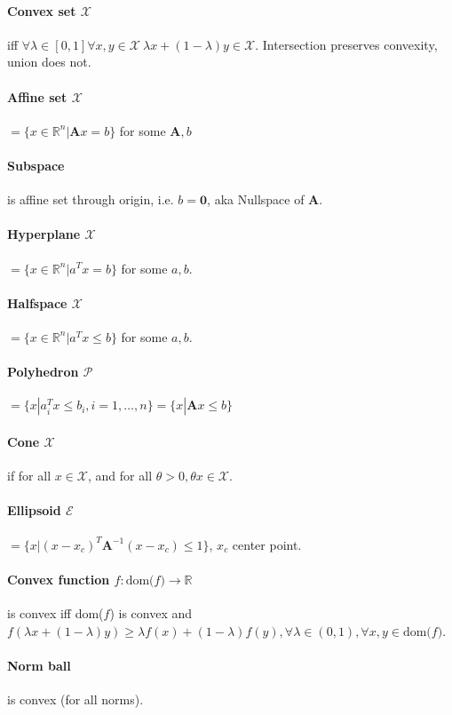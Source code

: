 \documentclass[landscape,a4paper,8pt]{scrartcl}
\newcommand{\mc}[1]{\mathcal{#1}}
\newcommand{\R}{\mathbb R}
\newcommand\vA{\bm{A}}
\begin{document}
\begin{multicols*}{3}
\paragraph{Convex set $\mc X$} iff $\forall \lambda \in [0, 1] \forall x, y \in \mc X\ \lambda x + (1-\lambda) y \in \mc X$.
Intersection preserves convexity, union does not.
\paragraph{Affine set $\mc X$} $= \{ x \in \R^n | \vA x = b \}$ for some $\vA,b$
\paragraph{Subspace} is affine set through origin, i.e. $b = \bm 0$, aka Nullspace of $\vA$.
\paragraph{Hyperplane $\mc X$} $= \{ x \in \R^n | a^T x = b \}$ for some $a, b$.
\paragraph{Halfspace $\mc X$} $= \{ x \in \R^n | a^T x \leq b \}$ for some $a, b$.
\paragraph{Polyhedron $\mc P$} $= \{ x | a_i^Tx \leq b_i, i = 1, \dots, n \} = \{ x | \vA x \leq b \}$
\paragraph{Cone $\mc X$} if for all $ x \in \mc X $, and for all $\theta > 0, \theta x \in \mc X$.
\paragraph{Ellipsoid $\mc E$} $= \{ x | (x-x_c)^T\vA^{-1}(x-x_c) \leq 1 \}$, $x_c$ center point.
\paragraph{Convex function $f : \text{dom($f$)} \rightarrow \R$} is convex iff dom($f$) is convex and 
$f (\lambda x + (1 - \lambda)y) \geq \lambda f(x) + (1-\lambda)f(y), \forall \lambda \in (0, 1), \forall x, y \in \text{dom($f$)}$.
\paragraph{Norm ball} is convex (for all norms).

\end{multicols*}
\end{document}
